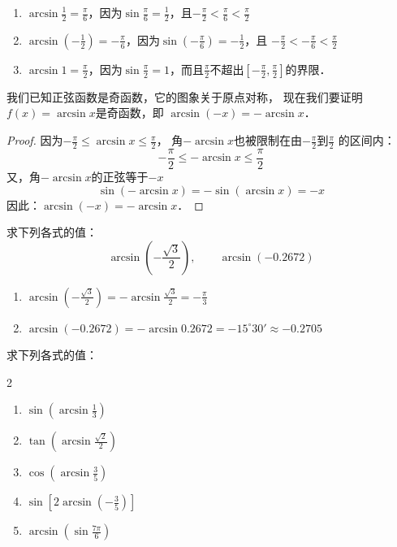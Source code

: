 \begin{solution}
\begin{enumerate}
    \item $\arcsin\frac{1}{2}=\frac{\pi}{6}$，因为$\sin\frac{\pi}{6}=\frac{1}{2}$，且$-\frac{\pi}{2}<\frac{\pi}{6}<\frac{\pi}{2}$

    \item $\arcsin\left(-\frac{1}{2}\right)=-\frac{\pi}{6}$，因为$\sin\left(-\frac{\pi}{6}\right)=-\frac{1}{2}$，且
    $-\frac{\pi}{2}<-\frac{\pi}{6}<\frac{\pi}{2}$
    \item $\arcsin 1=\frac{\pi}{2}$，因为$\sin\frac{\pi}{2}=1$，而且$\frac{\pi}{2}$不超出$\left[-\frac{\pi}{2},\frac{\pi}{2}\right]$的界限．
\end{enumerate}
\end{solution}

我们已知正弦函数是奇函数，它的图象关于原点对称，
现在我们要证明 $f(x)=\arcsin x$是奇函数，即
$\arcsin(-x)=-\arcsin x$．

\begin{proof}
    因为$-\frac{\pi}{2}\le \arcsin x\le \frac{\pi}{2}$，
    角$-\arcsin x$也被限制在由$-\frac{\pi}{2}$到$\frac{\pi}{2}$
    的区间内：
    $$-\frac{\pi}{2}\le -\arcsin x\le \frac{\pi}{2}$$
    又，角$-\arcsin x$的正弦等于$-x$
\[\sin(-\arcsin x)=-\sin(\arcsin x)=-x\]
因此：$\arcsin(-x)=-\arcsin x$．
\end{proof}

\begin{example}
    求下列各式的值：
\[\arcsin\left(-\frac{\sqrt{3}}{2}\right),\qquad \arcsin (-0.2672) \]
\end{example}

\begin{solution}
\begin{enumerate}
    \item $\arcsin\left(-\frac{\sqrt{3}}{2}\right)=-\arcsin\frac{\sqrt{3}}{2}=-\frac{\pi}{3}$
    \item $\arcsin(-0.2672)=-\arcsin0.2672=-15^{\circ}30'\approx -0.2705$
\end{enumerate}
    
\end{solution}



\begin{example}
    求下列各式的值：
\begin{multicols}{2}
\begin{enumerate}
    \item $\sin\left(\arcsin\frac{1}{3}\right)$
    \item $\tan\left(\arcsin\frac{\sqrt{2}}{2}\right)$
    \item $\cos\left(\arcsin\frac{3}{5}\right)$
    \item $\sin\left[2\arcsin\left(-\frac{3}{5}\right)\right]$
    \item $\arcsin\left(\sin\frac{7\pi}{6}\right)$
\end{enumerate}
\end{multicols}
\end{example}

